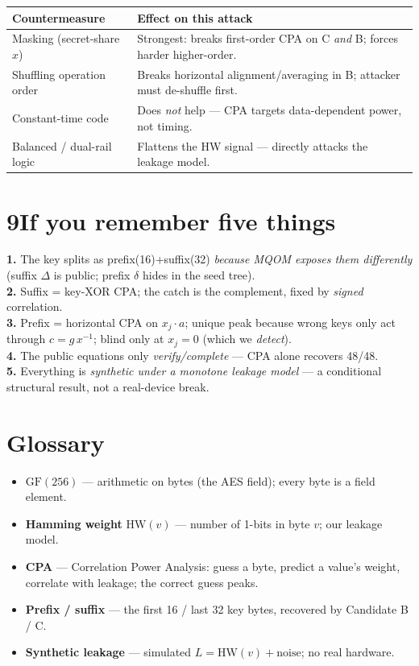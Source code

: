 \documentclass[11pt]{article}
\newcommand{\gf}{\mathrm{GF}(256)}
\newcommand{\hw}{\mathrm{HW}}
\begin{document}
\begin{center}\small
\begin{tabular}{@{}ll@{}}
\toprule
Countermeasure & Effect on this attack \\
\midrule
Masking (secret-share $x$) & Strongest: breaks first-order CPA on C \emph{and} B; forces harder higher-order. \\
Shuffling operation order & Breaks horizontal alignment/averaging in B; attacker must de-shuffle first. \\
Constant-time code & Does \emph{not} help --- CPA targets data-dependent power, not timing. \\
Balanced / dual-rail logic & Flattens the HW signal --- directly attacks the leakage model. \\
\bottomrule
\end{tabular}
\end{center}

\section*{9\quad If you remember five things}
\begin{keybox}
\textbf{1.} The key splits as prefix(16)+suffix(32) \emph{because MQOM exposes them
differently} (suffix $\Delta$ is public; prefix $\delta$ hides in the seed tree).\\
\textbf{2.} Suffix = key-XOR CPA; the catch is the complement, fixed by \emph{signed}
correlation.\\
\textbf{3.} Prefix = horizontal CPA on $x_j\!\cdot\!a$; unique peak because wrong keys only
act through $c=g\,x^{-1}$; blind only at $x_j{=}0$ (which we \emph{detect}).\\
\textbf{4.} The public equations only \emph{verify/complete} --- CPA alone recovers 48/48.\\
\textbf{5.} Everything is \emph{synthetic under a monotone leakage model} --- a conditional
structural result, not a real-device break.
\end{keybox}

\section*{Glossary}
\small
\begin{itemize}
\item $\gf$ --- arithmetic on bytes (the AES field); every byte is a field element.
\item \textbf{Hamming weight} $\hw(v)$ --- number of 1-bits in byte $v$; our leakage model.
\item \textbf{CPA} --- Correlation Power Analysis: guess a byte, predict a value's weight,
correlate with leakage; the correct guess peaks.
\item \textbf{Prefix / suffix} --- the first 16 / last 32 key bytes, recovered by Candidate B / C.
\item \textbf{Synthetic leakage} --- simulated $L=\hw(v)+\text{noise}$; no real hardware.
\end{itemize}
\end{document}
